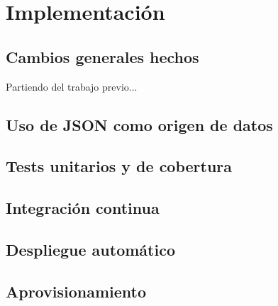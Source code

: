 \chapter{Implementación}

\section{Cambios generales hechos}

Partiendo del trabajo previo...

\section{Uso de JSON como origen de datos}

\section{Tests unitarios y de cobertura}

\section{Integración continua}

\section{Despliegue automático}

\section{Aprovisionamiento}